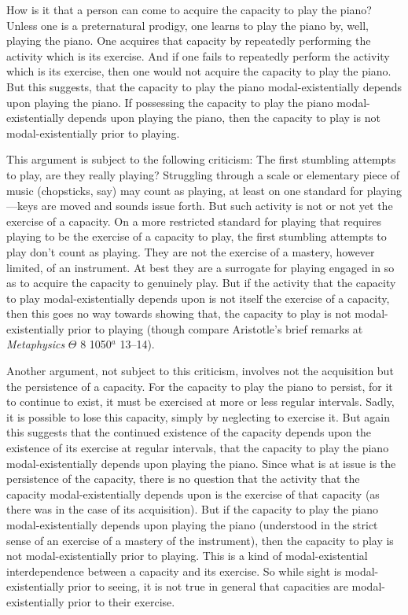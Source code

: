 \documentclass[12pt]{article}
\begin{document}
How is it that a person can come to acquire the capacity to play the piano? Unless one is a preternatural prodigy, one learns to play the piano by, well, playing the piano. One acquires that capacity by repeatedly performing the activity which is its exercise. And if one fails to repeatedly perform the activity which is its exercise, then one would not acquire the capacity to play the piano. But this suggests, that the capacity to play the piano modal-existentially depends upon playing the piano. If possessing the capacity to play the piano modal-existentially depends upon playing the piano, then the capacity to play is not modal-existentially prior to playing. 

This argument is subject to the following criticism: The first stumbling attempts to play, are they really playing? Struggling through a scale or elementary piece of music (chopsticks, say) may count as playing, at least on one standard for playing---keys are moved and sounds issue forth. But such activity is not or not yet the exercise of a capacity. On a more restricted standard for playing that requires playing to be the exercise of a capacity to play, the first stumbling attempts to play don't count as playing. They are not the exercise of a mastery, however limited, of an instrument. At best they are a surrogate for playing engaged in so as to acquire the capacity to genuinely play. But if the activity that the capacity to play modal-existentially depends upon is not itself the exercise of a capacity, then this goes no way towards showing that, the capacity to play is not modal-existentially prior to playing (though compare Aristotle's brief remarks at \emph{Metaphysics} \( \Theta \) 8 1050\( ^{a} \) 13--14).

Another argument, not subject to this criticism, involves not the acquisition but the persistence of a capacity. For the capacity to play the piano to persist, for it to continue to exist, it must be exercised at more or less regular intervals. Sadly, it is possible to lose this capacity, simply by neglecting to exercise it. But again this suggests that the continued existence of the capacity depends upon the existence of its exercise at regular intervals, that the capacity to play the piano modal-existentially depends upon playing the piano. Since what is at issue is the persistence of the capacity, there is no question that the activity that the capacity modal-existentially depends upon is the exercise of that capacity (as there was in the case of its acquisition). But if the capacity to play the piano modal-existentially depends upon playing the piano (understood in the strict sense of an exercise of a mastery of the instrument), then the capacity to play is not modal-existentially prior to playing. This is a kind of modal-existential interdependence between a capacity and its exercise. So while sight is modal-existentially prior to seeing, it is not true in general that capacities are modal-existentially prior to their exercise.
\end{document}
